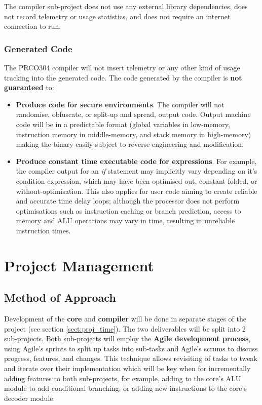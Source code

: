\documentclass[11pt,a4paper]{report}
\newcommand{\scname}{PRCO304}
\begin{document}
The compiler sub-project does not use any external library dependencies, does not record telemetry or usage statistics, and does not require an internet connection to run.

\subsection{Generated Code}
The \scname{} compiler will not insert telemetry or any other kind of usage tracking into the generated code.
The code generated by the compiler is \textbf{not guaranteed} to:
\begin{itemize}
\item{\textbf{Produce code for secure environments}. The compiler will not randomise, obfuscate, or split-up and spread, output code. Output machine code will be in a predictable format (global variables in low-memory, instruction memory in middle-memory, and stack memory in high-memory) making the binary easily subject to reverse-engineering and modification.}
\item{\textbf{Produce constant time executable code for expressions}. For example, the compiler output for an \textit{if} statement may implicitly vary depending on it's condition expression, which may have been optimised out, constant-folded, or without-optimisation. This also applies for user code aiming to create reliable and accurate time delay loops; although the processor does not perform optimisations such as instruction caching or branch prediction, access to memory and ALU operations may vary in time, resulting in unreliable instruction times.}
\end{itemize}



\chapter{Project Management}
{\hypersetup{linkcolor=black}
\startcontents[chapters]
}

\section{Method of Approach}
Development of the \textbf{core} and \textbf{compiler} will be done in separate stages of the project (see section \ref{sect:proj_time}). The two deliverables will be split into 2 sub-projects. Both sub-projects will employ the \textbf{Agile development process}, using Agile's sprints to split up tasks into sub-tasks and Agile's scrums to discuss progress, features, and changes. This technique allows revisiting of tasks to tweak and iterate over their implementation which will be key when for incrementally adding features to both sub-projects, for example, adding to the core's ALU module to add conditional branching, or adding new instructions to the core's decoder module.
\end{document}
